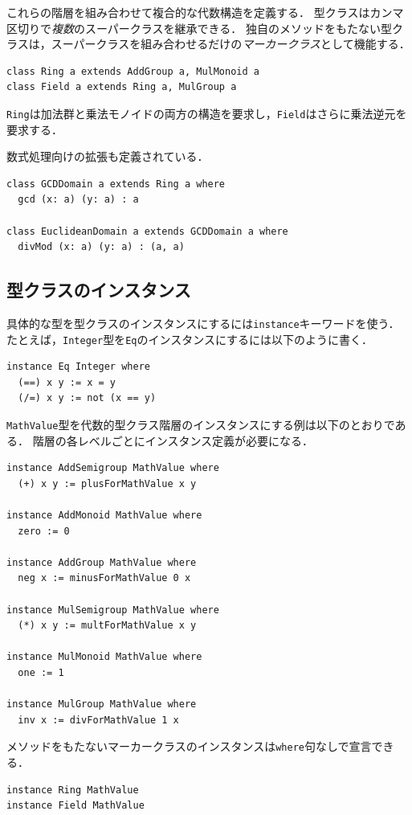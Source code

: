 これらの階層を組み合わせて複合的な代数構造を定義する．
型クラスはカンマ区切りで\emph{複数}のスーパークラスを継承できる．
独自のメソッドをもたない型クラスは，スーパークラスを組み合わせるだけの\emph{マーカークラス}として機能する．
\begin{lstlisting}[language=egison,numbers=none]
class Ring a extends AddGroup a, MulMonoid a
class Field a extends Ring a, MulGroup a
\end{lstlisting}
\lstinline{Ring}は加法群と乗法モノイドの両方の構造を要求し，\lstinline{Field}はさらに乗法逆元を要求する．

数式処理向けの拡張も定義されている．
\begin{lstlisting}[language=egison,numbers=none]
class GCDDomain a extends Ring a where
  gcd (x: a) (y: a) : a

class EuclideanDomain a extends GCDDomain a where
  divMod (x: a) (y: a) : (a, a)
\end{lstlisting}

\subsection{型クラスのインスタンス}

具体的な型を型クラスのインスタンスにするには\lstinline{instance}キーワードを使う．
たとえば，\lstinline{Integer}型を\lstinline{Eq}のインスタンスにするには以下のように書く．
\begin{lstlisting}[language=egison,numbers=none]
instance Eq Integer where
  (==) x y := x = y
  (/=) x y := not (x == y)
\end{lstlisting}

\lstinline{MathValue}型を代数的型クラス階層のインスタンスにする例は以下のとおりである．
階層の各レベルごとにインスタンス定義が必要になる．
\begin{lstlisting}[language=egison,numbers=none]
instance AddSemigroup MathValue where
  (+) x y := plusForMathValue x y

instance AddMonoid MathValue where
  zero := 0

instance AddGroup MathValue where
  neg x := minusForMathValue 0 x

instance MulSemigroup MathValue where
  (*) x y := multForMathValue x y

instance MulMonoid MathValue where
  one := 1

instance MulGroup MathValue where
  inv x := divForMathValue 1 x
\end{lstlisting}

メソッドをもたないマーカークラスのインスタンスは\lstinline{where}句なしで宣言できる．
\begin{lstlisting}[language=egison,numbers=none]
instance Ring MathValue
instance Field MathValue
\end{lstlisting}

